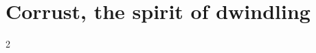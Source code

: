 \section*{\centering \fontsize{35}{45}\selectfont Corrust, the spirit of dwindling}
\vspace*{0.4 cm}

\begin{multicols*}{2}

\

\end{multicols*}